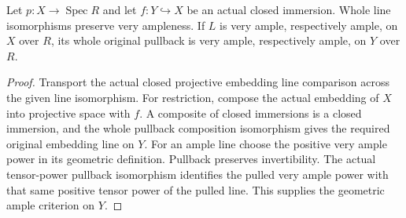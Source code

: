 \begin{lemma}
\label{lem:fc-original-ample-closed-restriction}
\leanok
{}
Let $p:X\to\operatorname{Spec}R$ and let $f:Y\hookrightarrow X$ be an
actual closed immersion. Whole line isomorphisms preserve very ampleness.
If $L$ is very ample, respectively ample, on $X$ over $R$, its whole
original pullback is very ample, respectively ample, on $Y$ over $R$.
\end{lemma}
\begin{proof}
Transport the actual closed projective embedding line comparison across
the given line isomorphism. For restriction, compose the actual embedding
of $X$ into projective space with $f$. A composite of closed immersions is
a closed immersion, and the whole pullback composition isomorphism gives
the required original embedding line on $Y$. For an ample line choose
the positive very ample power in its geometric definition. Pullback
preserves invertibility. The actual tensor-power pullback isomorphism
identifies the pulled very ample power with that same positive tensor
power of the pulled line. This supplies the geometric ample criterion
on $Y$.
\end{proof}
